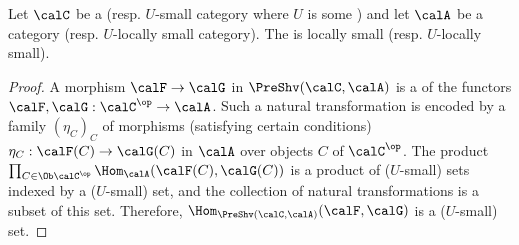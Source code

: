 \begin{lemma} \label{lemma:category_of_presheaves_on_a_small_category_of_locally_small_value_is_locally_small}
    Let $\calC$ be a  (resp. $U$-small category where $U$ is some ) and let $\calA$ be a  category (resp. $U$-locally small category). The  is locally small (resp. $U$-locally small).
\end{lemma}
\begin{proof}
    A morphism $\calF \to \calG$ in $\PreShv(\calC, \calA)$ is a  of the functors $\calF, \calG: \calC^{\op} \to \calA$. Such a natural transformation is encoded by a family $(\eta_C)_C$ of morphisms (satisfying certain conditions) $\eta_C: \calF(C) \to \calG(C)$ in $\calA$ over objects $C$ of $\calC^{\op}$. The product $\prod_{C \in \Ob \calC^{\op}} \Hom_{\calA}(\calF(C), \calG(C))$ is a product of ($U$-small) sets indexed by a ($U$-small) set, and the collection of natural transformations is a subset of this set. Therefore, $\Hom_{\PreShv(\calC, \calA)}(\calF, \calG)$ is a ($U$-small) set.  
\end{proof}
